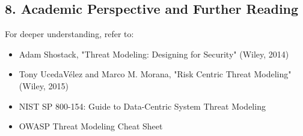 \subsection*{8. Academic Perspective and Further Reading}
For deeper understanding, refer to:
\begin{itemize}
	\item Adam Shostack, "Threat Modeling: Designing for Security" (Wiley, 2014)
	\item Tony UcedaVélez and Marco M. Morana, "Risk Centric Threat Modeling" (Wiley, 2015)
	\item NIST SP 800-154: Guide to Data-Centric System Threat Modeling
	\item OWASP Threat Modeling Cheat Sheet
\end{itemize}
